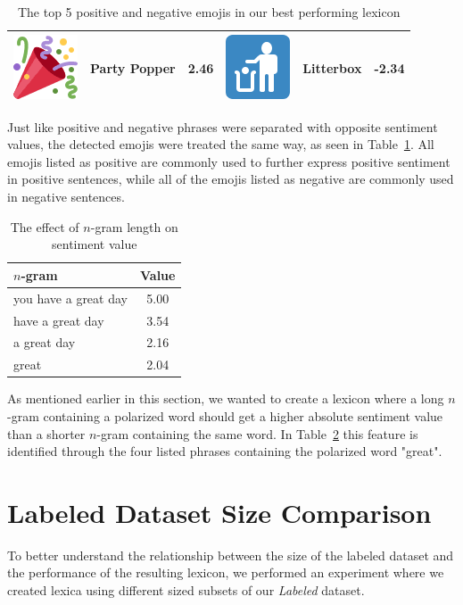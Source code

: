 \begin{table}[t]
\begin{tabular}{| c | l | l || c | l | l |}
        \includegraphics[height=.5cm]{./figs/emojis/party_popper} & Party Popper & 2.46 
        & \includegraphics[height=.5cm]{./figs/emojis/put_litter_in_its_place} & Litterbox & -2.34 \\ \hline
    \end{tabular}
    \caption[Top 5 positive and negative emojis in our lexicon]{The top 5 positive and negative emojis in our best performing lexicon}
    \label{tab:lexicon_emoji_entries}
\end{table}

Just like positive and negative phrases were separated with opposite sentiment values, the detected emojis were treated the same way, as seen in Table~\ref{tab:lexicon_emoji_entries}. All emojis listed as positive are commonly used to further express positive sentiment in positive sentences, while all of the emojis listed as negative are commonly used in negative sentences. \\

\begin{table}[t]
    \centering
    \begin{tabular}{| l | c |}
    \hline
    \textbf{$n$-gram} & \textbf{Value} \\ \hline
    you have a great day & 5.00  \\ \hline
    have a great day &  3.54 \\ \hline
    a great day & 2.16 \\ \hline
    great & 2.04 \\ \hline
    \end{tabular}
    \caption[Effect of $n$-gram length on sentiment value in our lexicon]{The effect of $n$-gram length on sentiment value}
    \label{tab:lexicon_entry_length_effect}
\end{table}

As mentioned earlier in this section, we wanted to create a lexicon where a long $n$-gram containing a polarized word should get a higher absolute sentiment value than a shorter $n$-gram containing the same word. In Table~\ref{tab:lexicon_entry_length_effect} this feature is identified through the four listed phrases containing the polarized word "great".

\section{Labeled Dataset Size Comparison}
\label{sec:labeled_dataset_size_comparison}
To better understand the relationship between the size of the labeled dataset and the performance of the resulting lexicon, we performed an experiment where we created lexica using different sized subsets of our \textit{Labeled} dataset. \\

